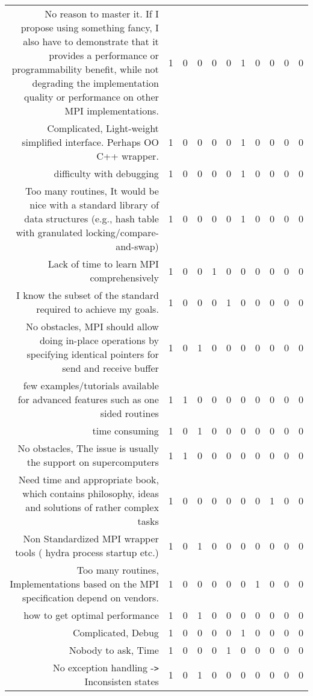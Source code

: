 {\begin{landscape}
\begin{longtable}[htb]{r|c|c|c|c|c|c|c|c|c|c}
{No reason to master it. If I propose using something fancy, I also have to demonstrate that it provides a performance or programmability benefit, while not degrading the implementation quality or performance on other MPI implementations.} & 1 & 0 & 0 & 0 & 0 & 1 & 0 & 0 & 0 & 0 \\%
{Complicated, Light-weight simplified interface. Perhaps OO C++ wrapper.} & 1 & 0 & 0 & 0 & 0 & 1 & 0 & 0 & 0 & 0 \\%
{difficulty with debugging} & 1 & 0 & 0 & 0 & 0 & 1 & 0 & 0 & 0 & 0 \\%
{Too many routines, It would be nice with a standard library of data structures (e.g., hash table with granulated locking/compare-and-swap)} & 1 & 0 & 0 & 0 & 0 & 1 & 0 & 0 & 0 & 0 \\%
{Lack of time to learn MPI comprehensively} & 1 & 0 & 0 & 1 & 0 & 0 & 0 & 0 & 0 & 0 \\%
{I know the subset of the standard required to achieve my goals.} & 1 & 0 & 0 & 0 & 1 & 0 & 0 & 0 & 0 & 0 \\%
{No obstacles, MPI should allow doing in-place operations by specifying identical pointers for send and receive buffer} & 1 & 0 & 1 & 0 & 0 & 0 & 0 & 0 & 0 & 0 \\%
{few examples/tutorials available for advanced features such as one sided routines} & 1 & 1 & 0 & 0 & 0 & 0 & 0 & 0 & 0 & 0 \\%
{time consuming} & 1 & 0 & 1 & 0 & 0 & 0 & 0 & 0 & 0 & 0 \\%
{No obstacles, The issue is usually the support on supercomputers} & 1 & 1 & 0 & 0 & 0 & 0 & 0 & 0 & 0 & 0 \\%
{Need time and appropriate book, which contains philosophy, ideas and solutions of rather complex tasks} & 1 & 0 & 0 & 0 & 0 & 0 & 0 & 1 & 0 & 0 \\%
{Non  Standardized MPI wrapper tools ( hydra process startup etc.)} & 1 & 0 & 1 & 0 & 0 & 0 & 0 & 0 & 0 & 0 \\%
{Too many routines, Implementations based on the MPI specification depend on vendors.} & 1 & 0 & 0 & 0 & 0 & 0 & 1 & 0 & 0 & 0 \\%
{how to get optimal performance} & 1 & 0 & 1 & 0 & 0 & 0 & 0 & 0 & 0 & 0 \\%
{Complicated, Debug} & 1 & 0 & 0 & 0 & 0 & 1 & 0 & 0 & 0 & 0 \\%
{Nobody to ask, Time} & 1 & 0 & 0 & 0 & 1 & 0 & 0 & 0 & 0 & 0 \\%
{No exception handling -\verb!>! Inconsisten states} & 1 & 0 & 1 & 0 & 0 & 0 & 0 & 0 & 0 & 0 \\%

\end{longtable}
\end{landscape}}
